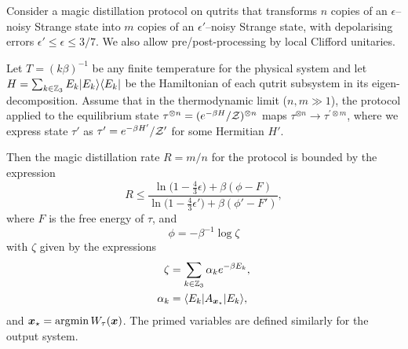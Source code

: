 \documentclass[pra,
aps,
twocolumn,
superscriptaddress,
groupedaddress,
nofootinbib,
reprint
]{revtex4-1}
\begin{document}
\begingroup
\def\thetheorem{\ref{thm:free-energy}}
\begin{theorem}
	Consider a magic distillation protocol on qutrits that transforms $n$ copies of an $\epsilon$--noisy Strange state into $m$ copies of an $\epsilon'$--noisy Strange state, with depolarising errors $\epsilon' \leq \epsilon \leq 3/7$. We also allow pre/post-processing by local Clifford unitaries.
	
	Let $T =(k\beta)^{-1}$ be any finite temperature for the physical system and let $H= \sum_{k \in \mathbb{Z}_3} E_k |E_k\rangle\langle E_k|$ be the Hamiltonian of each qutrit subsystem in its eigen-decomposition.
Assume that in the thermodynamic limit ($n,m \gg 1$), the protocol applied to the equilibrium state $\tau^{\otimes n} = (e^{-\beta H}/\mathcal{Z})^{\otimes n}$ maps $\tau^{\otimes n} \longrightarrow \tau^{\prime \otimes m}$, where we express state $\tau'$ as $\tau' = e^{-\beta H'}/\mathcal{Z}'$ for some Hermitian $H'$.

Then the magic distillation rate $R = m/n$ for the protocol is bounded by the expression
\begin{equation}
	R \leq \dfrac{\ln{\big( 1-\frac{4}{3}\epsilon \big)} + \beta (\phi - F)}{\ln{\big( 1-\frac{4}{3}\epsilon' \big)} + \beta (\phi' - F')},
\end{equation}
where $F$ is the free energy of $\tau$,  and 
\begin{equation}
	\phi = -\beta^{-1} \log \zeta
\end{equation}
with $\zeta$ given by the expressions
\begin{align}
	\zeta &= \sum_{k\in \mathbb{Z}_3} \alpha_k e^{-\beta E_k}, \nonumber\\
	\alpha_k &= \langle E_k| A_{\boldsymbol{x}_\star} |E_k\rangle,
\end{align}
and $\boldsymbol{x}_\star = \arg\!\min W_\tau(\boldsymbol{x})$. The primed variables are defined similarly for the output system.
\end{theorem}
\addtocounter{theorem}{-1}
\endgroup
\end{document}
